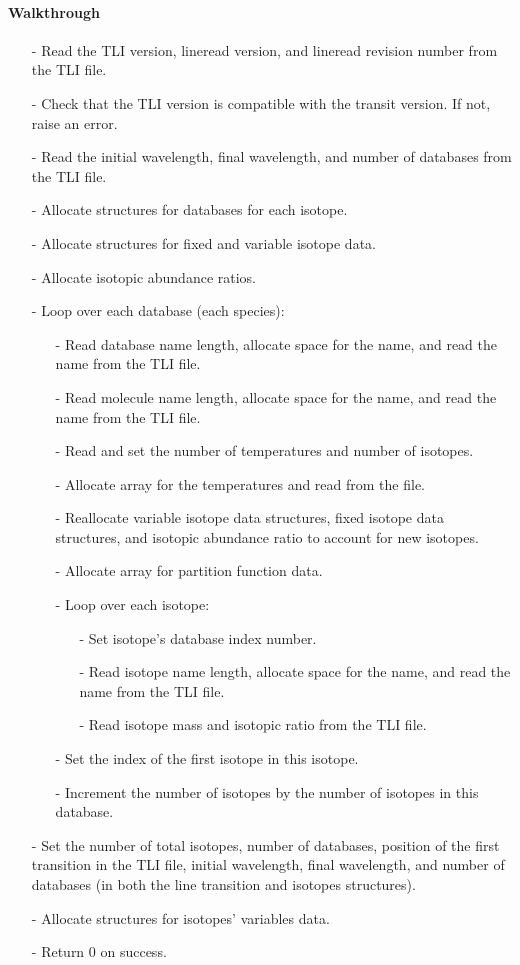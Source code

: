 \documentclass[letterpaper,12pt]{article}
\begin{document}
\paragraph{Walkthrough}
\begin{enumerate}[leftmargin=10pt, noitemsep, parsep=0pt, topsep=0ex]
\item[-] Read the TLI version, lineread version, and lineread revision number from the TLI file.
\item[-] Check that the TLI version is compatible with the transit version. If not, raise an error.
\item[-] Read the initial wavelength, final wavelength, and number of databases from the TLI file.
\item[-] Allocate structures for databases for each isotope.
\item[-] Allocate structures for fixed and variable isotope data.
\item[-] Allocate isotopic abundance ratios.
\item[-] Loop over each database (each species):
\begin{enumerate}[leftmargin=10pt, noitemsep, parsep=0pt, topsep=0ex]
\item[-] Read database name length, allocate space for the name, and read the name from the TLI file.
\item[-] Read molecule name length, allocate space for the name, and read the name from the TLI file.
\item[-] Read and set the number of temperatures and number of isotopes.
\item[-] Allocate array for the temperatures and read from the file.
\item[-] Reallocate variable isotope data structures, fixed isotope data structures, and isotopic abundance ratio to account for new isotopes.
\item[-] Allocate array for partition function data.
\item[-] Loop over each isotope:
\begin{enumerate}[leftmargin=10pt, noitemsep, parsep=0pt, topsep=0ex]
\item[-] Set isotope's database index number.
\item[-] Read isotope name length, allocate space for the name, and read the name from the TLI file.
\item[-] Read isotope mass and isotopic ratio from the TLI file.
\end{enumerate}
\item[-] Set the index of the first isotope in this isotope.
\item[-] Increment the number of isotopes by the number of isotopes in this database.
\end{enumerate}
\item[-] Set the number of total isotopes, number of databases, position of the first transition in the TLI file, initial wavelength, final wavelength, and number of databases (in both the line transition and isotopes structures).
\item[-] Allocate structures for isotopes' variables data.
\item[-] Return 0 on success.
\end{enumerate}
\end{document}
